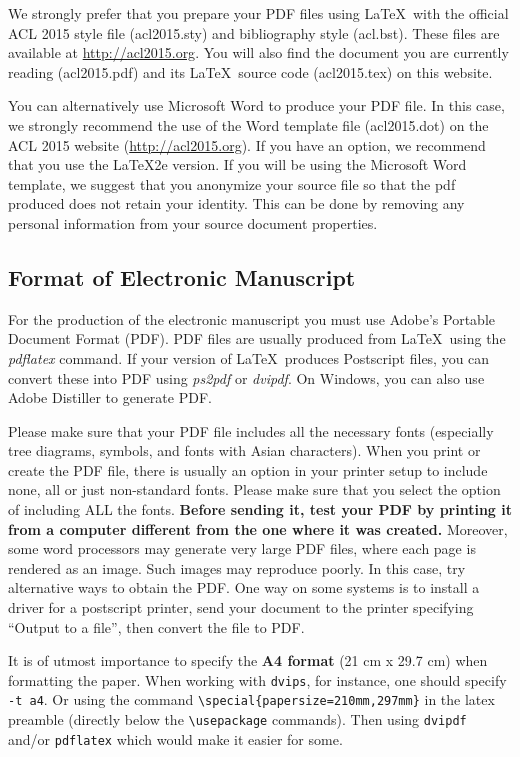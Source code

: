 \documentclass[11pt,a4paper]{article}
\begin{document}
We strongly prefer that you prepare your PDF files using \LaTeX\ with
the official ACL 2015 style file (acl2015.sty) and bibliography style
(acl.bst). These files are available at
\url{http://acl2015.org}. You will also find the document
you are currently reading (acl2015.pdf) and its \LaTeX\ source code
(acl2015.tex) on this website.

You can alternatively use Microsoft Word to produce your PDF file. In
this case, we strongly recommend the use of the Word template file
(acl2015.dot) on the ACL 2015 website (\url{http://acl2015.org}).
If you have an option, we recommend that you use the \LaTeX2e version.
If you will be using the Microsoft Word template, we suggest that you
anonymize your source file so that the pdf produced does not retain your
identity.  This can be done by removing any personal information
from your source document properties.



\subsection{Format of Electronic Manuscript}
\label{sect:pdf}

For the production of the electronic manuscript you must use Adobe's
Portable Document Format (PDF). PDF files are usually produced from
\LaTeX\ using the \textit{pdflatex} command. If your version of
\LaTeX\ produces Postscript files, you can convert these into PDF
using \textit{ps2pdf} or \textit{dvipdf}. On Windows, you can also use
Adobe Distiller to generate PDF.

Please make sure that your PDF file includes all the necessary fonts
(especially tree diagrams, symbols, and fonts with Asian
characters). When you print or create the PDF file, there is usually
an option in your printer setup to include none, all or just
non-standard fonts.  Please make sure that you select the option of
including ALL the fonts. \textbf{Before sending it, test your PDF by
  printing it from a computer different from the one where it was
  created.} Moreover, some word processors may generate very large PDF
files, where each page is rendered as an image. Such images may
reproduce poorly. In this case, try alternative ways to obtain the
PDF. One way on some systems is to install a driver for a postscript
printer, send your document to the printer specifying ``Output to a
file'', then convert the file to PDF.

It is of utmost importance to specify the \textbf{A4 format} (21 cm
x 29.7 cm) when formatting the paper. When working with
{\tt dvips}, for instance, one should specify {\tt -t a4}.
Or using the command \verb|\special{papersize=210mm,297mm}| in the latex
preamble (directly below the \verb|\usepackage| commands). Then using
{\tt dvipdf} and/or {\tt pdflatex} which would make it easier for some.
\end{document}
